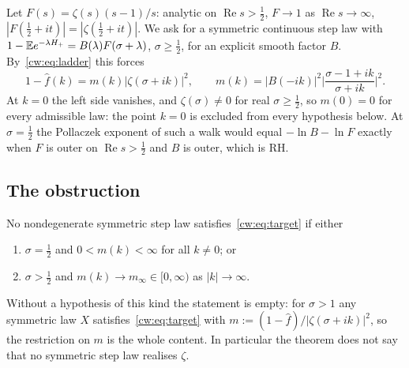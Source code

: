 Let $F(s)=\zeta(s)(s-1)/s$: analytic on $\operatorname{Re}s>\tfrac12$, $F\to1$ as $\operatorname{Re}s\to\infty$, $|F(\tfrac12+it)|=|\zeta(\tfrac12+it)|$. We ask for a symmetric continuous step law with $1-\mathbb{E} e^{-\lambda H_+}=B(\lambda)F(\sigma+\lambda)$, $\sigma\ge\frac12$, for an explicit smooth factor $B$. By~\eqref{cw:eq:ladder} this forces
\begin{equation}\label{cw:eq:target}
1-\hat f(k)=m(k)|\zeta(\sigma+ik)|^2,\qquad m(k)=|B(-ik)|^2\Big|\frac{\sigma-1+ik}{\sigma+ik}\Big|^2 .
\end{equation}
At $k=0$ the left side vanishes, and $\zeta(\sigma)\ne0$ for real $\sigma\ge\frac12$, so $m(0)=0$ for every admissible law: the point $k=0$ is excluded from every hypothesis below. At $\sigma=\frac12$ the Pollaczek exponent of such a walk would equal $-\ln B-\ln F$ exactly when $F$ is outer on $\operatorname{Re}s>\frac12$ and $B$ is outer, which is RH.

\subsection{The obstruction}
\begin{theorem}\label{cw:thm:obstruction}
No nondegenerate symmetric step law satisfies~\eqref{cw:eq:target} if either
\begin{enumerate}
\item[(a)] $\sigma=\frac12$ and $0<m(k)<\infty$ for all $k\ne0$; or
\item[(b)] $\sigma>\frac12$ and $m(k)\to m_\infty\in[0,\infty)$ as $|k|\to\infty$.
\end{enumerate}
\end{theorem}
Without a hypothesis of this kind the statement is empty: for $\sigma>1$ any symmetric law $X$ satisfies~\eqref{cw:eq:target} with $m:=(1-\hat f)/|\zeta(\sigma+ik)|^2$, so the restriction on $m$ is the whole content. In particular the theorem does not say that no symmetric step law realises $\zeta$.

